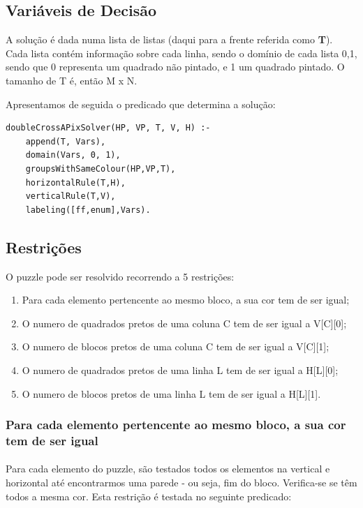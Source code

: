 \documentclass[runningheads,a4paper]{llncs}
\begin{document}
\subsection{Variáveis de Decisão}

A solução é dada numa lista de listas (daqui para a frente referida como \textbf{T}). Cada lista contém informação sobre cada linha, sendo o domínio de cada lista {0,1}, sendo que 0 representa um quadrado não pintado, e 1 um quadrado pintado. O tamanho de T é, então M x N.

Apresentamos de seguida o predicado que determina a solução:

\begin{lstlisting}
doubleCrossAPixSolver(HP, VP, T, V, H) :-	
	append(T, Vars),
	domain(Vars, 0, 1),
	groupsWithSameColour(HP,VP,T),
	horizontalRule(T,H),
	verticalRule(T,V),
	labeling([ff,enum],Vars).
\end{lstlisting}

\subsection{Restrições}

O puzzle pode ser resolvido recorrendo a 5 restrições:

\begin{enumerate}
\item Para cada elemento pertencente ao mesmo bloco, a sua cor tem de ser igual;
\item O numero de quadrados pretos de uma coluna C tem de ser igual a V[C][0];
\item O numero de blocos pretos de uma coluna C tem de ser igual a V[C][1];
\item O numero de quadrados pretos de uma linha L tem de ser igual a H[L][0];
\item O numero de blocos pretos de uma linha L tem de ser igual a H[L][1].
\end{enumerate}

\subsubsection{Para cada elemento pertencente ao mesmo bloco, a sua cor tem de ser igual}
\paragraph{}
Para cada elemento do puzzle, são testados todos os elementos na vertical e horizontal até encontrarmos uma parede - ou seja, fim do bloco. Verifica-se se têm todos a mesma cor.
Esta restrição é testada no seguinte predicado:
\end{document}
